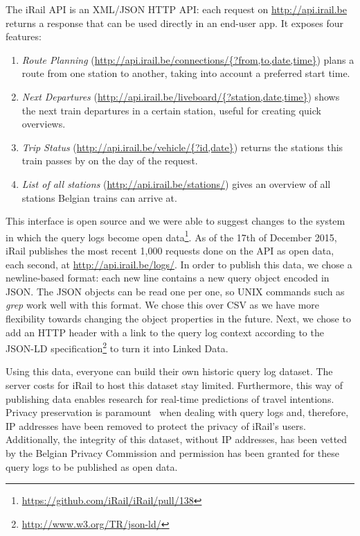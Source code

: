 \documentclass{sig-alternate}
\begin{document}
The iRail API is an XML/JSON HTTP API: each request on \url{http://api.irail.be} returns a response that can be used directly in an end-user app.
It exposes four features: 
\begin{enumerate}
\item \emph{Route Planning} (\url{http://api.irail.be/connections/{?from,to,date,time}}) plans a route from one station to another, taking into account a preferred start time.
\item \emph{Next Departures} (\url{http://api.irail.be/liveboard/{?station,date,time}}) shows the next train departures in a certain station, useful for creating quick overviews.
\item \emph{Trip Status} (\url{http://api.irail.be/vehicle/{?id,date}}) returns the stations this train passes by on the day of the request.
\item \emph{List of all stations} (\url{http://api.irail.be/stations/}) gives an overview of all stations Belgian trains can arrive at.
\end{enumerate}

This interface is open source and we were able to suggest changes to the system in which the query logs become open data\footnote{\url{https://github.com/iRail/iRail/pull/138}}.
As of the 17th of December 2015, iRail publishes the most recent 1,000 requests done on the API as open data, each second, at \url{http://api.irail.be/logs/}.
In order to publish this data, we chose a newline-based format: each new line contains a new query object encoded in JSON. 
The JSON objects can be read one per one, so UNIX commands such as \emph{grep} work well with this format.
We chose this over CSV as we have more flexibility towards changing the object properties in the future.
Next, we chose to add an HTTP header with a link to the query log context according to the JSON-LD specification\footnote{\url{http://www.w3.org/TR/json-ld/}} to turn it into Linked Data.

Using this data, everyone can build their own historic query log dataset.
The server costs for iRail to host this dataset stay limited.
Furthermore, this way of publishing data enables research for real-time predictions of travel intentions.
Privacy preservation is paramount~\cite{silvestri} when dealing with query logs and, therefore, IP addresses have been removed to protect the privacy of iRail's users. 
Additionally, the integrity of this dataset, without IP addresses, has been vetted by the Belgian Privacy Commission and permission has been granted for these query logs to be published as open data.
\end{document}
